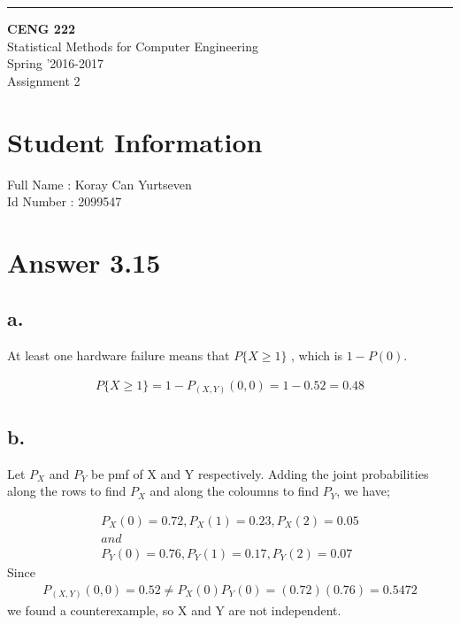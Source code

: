 \documentclass[12pt]{article}
\begin{document}
\noindent
\rule{0.5\textwidth}{.4pt}
\begin{flushright}

                                          \large \textbf{CENG 222}  \\[4mm]
                                          \large Statistical Methods for Computer Engineering \\[4mm]
                                         \normalsize      Spring '2016-2017 \\
                                            \large   Assignment 2
\end{flushright}


\section*{Student Information } 
Full Name :  Koray Can Yurtseven\\
Id Number :  2099547\\

\section*{Answer 3.15}
\subsection*{a.}
At least one hardware failure means that $P\{X \geq 1\}$ , which is $1-P(0)$.

\begin{align*}
P\{X \geq 1\} =  1 - P_{(X,Y)}(0,0) = 1 - 0.52 =0.48
\end{align*}
\subsection*{b.}

Let $P_X$ and $P_Y$ be pmf of X and Y respectively. Adding the joint probabilities along the rows to find $P_X$ and along the coloumns to find $P_Y$, we have;

\begin{align*}
P_X(0) =  0.72 ,P_X(1) =  0.23 ,P_X(2) =  0.05 
\\and\\
P_Y(0) =  0.76 ,P_Y(1) =  0.17 ,P_Y(2) =  0.07
\end{align*}
Since 
\begin{align*}
P_{(X,Y)}(0,0) = 0.52 \ne P_X(0)P_Y(0) = (0.72)(0.76) = 0.5472
\end{align*}
we found a counterexample, so X and Y are not independent.
\end{document}
